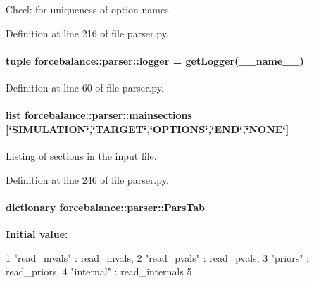 \-Check for uniqueness of option names. 



\-Definition at line 216 of file parser.\-py.

\hypertarget{namespaceforcebalance_1_1parser_a0e0761161c5ff444c7afbcc9157cd710}{
\paragraph[{logger}]{\setlength{\rightskip}{0pt plus 5cm}tuple {\bf forcebalance\-::parser\-::logger} = get\-Logger(\-\_\-\-\_\-name\-\_\-\-\_\-)}}\label{namespaceforcebalance_1_1parser_a0e0761161c5ff444c7afbcc9157cd710}


\-Definition at line 60 of file parser.\-py.

\hypertarget{namespaceforcebalance_1_1parser_a525ac339b645dbfb9fbb7cc672712504}{
\paragraph[{mainsections}]{\setlength{\rightskip}{0pt plus 5cm}list {\bf forcebalance\-::parser\-::mainsections} = \mbox{[}\char`\"{}\-S\-I\-M\-U\-L\-A\-T\-I\-O\-N\char`\"{},\char`\"{}\-T\-A\-R\-G\-E\-T\char`\"{},\char`\"{}\-O\-P\-T\-I\-O\-N\-S\char`\"{},\char`\"{}\-E\-N\-D\char`\"{},\char`\"{}\-N\-O\-N\-E\char`\"{}\mbox{]}}}\label{namespaceforcebalance_1_1parser_a525ac339b645dbfb9fbb7cc672712504}


\-Listing of sections in the input file. 



\-Definition at line 246 of file parser.\-py.

\hypertarget{namespaceforcebalance_1_1parser_af0a8dc5cdc54cc88ded3ee3b46d71672}{
\paragraph[{\-Pars\-Tab}]{\setlength{\rightskip}{0pt plus 5cm}dictionary {\bf forcebalance\-::parser\-::\-Pars\-Tab}}}\label{namespaceforcebalance_1_1parser_af0a8dc5cdc54cc88ded3ee3b46d71672}
{\bfseries \-Initial value\-:}
\begin{DoxyCode}
1 {"read_mvals" : read_mvals,
2             "read_pvals" : read_pvals,
3             "priors"     : read_priors,
4             "internal"   : read_internals
5             }
\end{DoxyCode}


